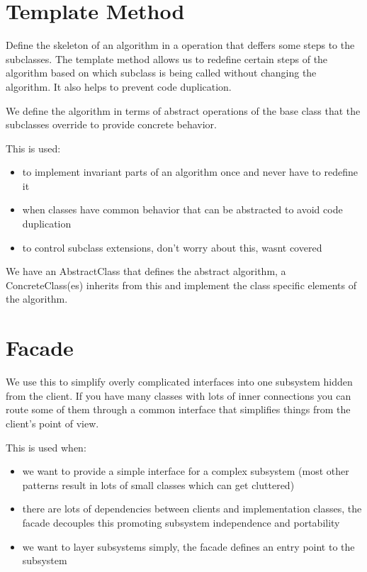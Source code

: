 \documentclass[12pt]{article}
\begin{document}
\section*{Template Method}
Define the skeleton of an algorithm in a operation that deffers some steps to the subclasses. The template method allows us to redefine certain steps of the algorithm based on which subclass is being called without changing the algorithm. It also helps to prevent code duplication.

We define the algorithm in terms of abstract operations of the base class that the subclasses override to provide concrete behavior.

This is used:
\begin{itemize}
    \item to implement invariant parts of an algorithm once and never have to redefine it
    \item when classes have common behavior that can be abstracted to avoid code duplication
    \item to control subclass extensions, don't worry about this, wasnt covered
\end{itemize}

We have an AbstractClass that defines the abstract algorithm, a ConcreteClass(es) inherits from this and implement the class specific elements of the algorithm.

\section*{Facade}
We use this to simplify overly complicated interfaces into one subsystem hidden from the client. If you have many classes with lots of inner connections you can route some of them through a common interface that simplifies things from the client's point of view.

This is used when:
\begin{itemize}
    \item we want to provide a simple interface for a complex subsystem (most other patterns result in lots of small classes which can get cluttered)
    \item there are lots of dependencies between clients and implementation classes, the facade decouples this promoting subsystem independence and portability
    \item we want to layer subsystems simply, the facade defines an entry point to the subsystem
\end{itemize}
\end{document}
